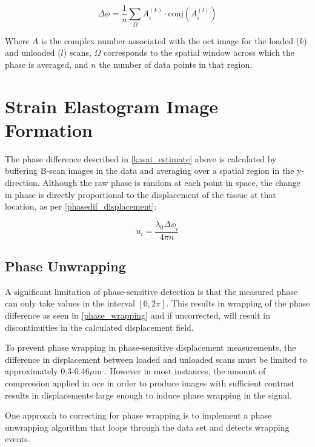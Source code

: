 \begin{equation}
	\Delta\phi = \frac{1}{n} \sum_\Omega A_i^{(k)} \cdot \text{conj}(A_i^{(l)})
	\label{kasai_estimate}
\end{equation}

Where $A$ is the complex number associated with the \ac{oct} image for the loaded ($k$) and unloaded ($l$) scans, $\Omega$ corresponds to the spatial window across which the phase is averaged, and $n$ the number of data points in that region.

\section{Strain Elastogram Image Formation}

The phase difference described in \autoref{kasai_estimate} above is calculated by buffering B-scan images in the data and averaging over a spatial region in the y-direction. Although the raw phase is random at each point in space, the change in phase is directly proportional to the displacement of the tissue at that location, as per \autoref{phasedif_displacement}:

\begin{equation}
	u_i = \frac{\lambda_0 \Delta\phi_i}{4\pi n}
	\label{phasedif_displacement}
\end{equation}

\subsection{Phase Unwrapping}

A significant limitation of phase-sensitive detection is that the measured phase can only take values in the interval $[0,2\pi]$. This results in wrapping of the phase difference as seen in \autoref{phase_wrapping} and if uncorrected, will result in discontinuities in the calculated displacement field.

To prevent phase wrapping in phase-sensitive displacement measurements, the difference in displacement between loaded and unloaded scans must be limited to approximately 0.3-0.46$\mu$m \cite{kennedy_optical_2014}. However in most instances, the amount of compression applied in \ac{oce} in order to produce images with sufficient contrast results in displacements large enough to induce phase wrapping in the signal. 

One approach to correcting for phase wrapping is to implement a phase unwrapping algorithm that loops through the data set and detects wrapping events. 

